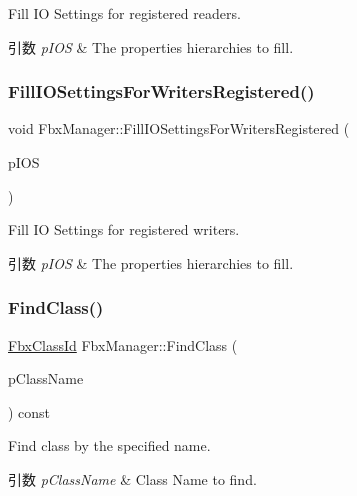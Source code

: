 Fill IO Settings for registered readers. 
\begin{DoxyParams}{引数}
{\em p\+I\+OS} & The properties hierarchies to fill. \\
\hline
\end{DoxyParams}
\mbox{\label{class_fbx_manager_aa2cd6f7b73641743427db129ac67d575}} 
\subsubsection{\texorpdfstring{Fill\+I\+O\+Settings\+For\+Writers\+Registered()}{FillIOSettingsForWritersRegistered()}}
{\footnotesize\ttfamily void Fbx\+Manager\+::\+Fill\+I\+O\+Settings\+For\+Writers\+Registered (\begin{DoxyParamCaption}\item[{\hyperlink{class_fbx_i_o_settings}{Fbx\+I\+O\+Settings} \&}]{p\+I\+OS }\end{DoxyParamCaption})}

Fill IO Settings for registered writers. 
\begin{DoxyParams}{引数}
{\em p\+I\+OS} & The properties hierarchies to fill. \\
\hline
\end{DoxyParams}
\mbox{\label{class_fbx_manager_a680992a09352225efbda1f3d76c9d495}} 
\subsubsection{\texorpdfstring{Find\+Class()}{FindClass()}}
{\footnotesize\ttfamily \hyperlink{class_fbx_class_id}{Fbx\+Class\+Id} Fbx\+Manager\+::\+Find\+Class (\begin{DoxyParamCaption}\item[{const char $\ast$}]{p\+Class\+Name }\end{DoxyParamCaption}) const}

Find class by the specified name. 
\begin{DoxyParams}{引数}
{\em p\+Class\+Name} & Class Name to find. \\
\hline
\end{DoxyParams}
\mbox{\label{class_fbx_manager_af3ef43f7605e2f29a49b86fdbf740364}} 

